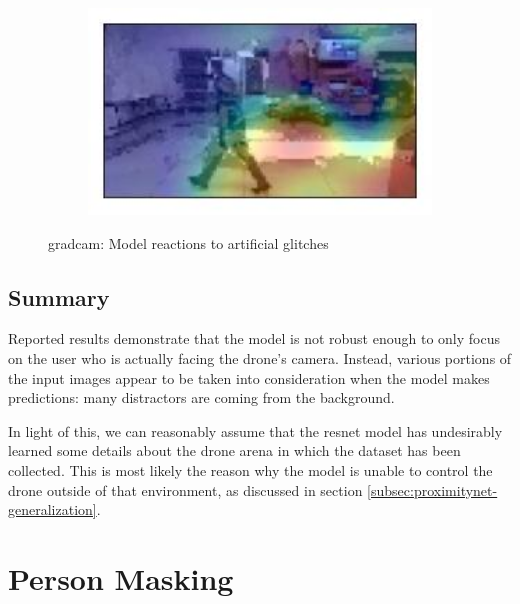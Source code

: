 \begin{figure}[!h]
\begin{center}
\begin{subfigure}[h]{0.24\textwidth}
		\end{subfigure}
		\hfill
		\begin{subfigure}[h]{0.24\textwidth}
			\centering
			\includegraphics[width=1\textwidth]{"contents/images/gradcam/gradcam-glitch-4"}
		\end{subfigure}
	\end{center}
	\vspace{-0.5cm}
	\caption[\gls{gradcam}: Model reactions to artificial glitches]{\gls{gradcam}: Model reactions to artificial glitches}
	\label{fig:gradcam-glitch}
\end{figure}



\subsection{Summary}
\label{subsec:proposed-approach}

Reported results demonstrate that the model is not robust enough to only focus on the user who is actually facing the drone's camera. Instead, various portions of the input images appear to be taken into consideration when the model makes predictions: many distractors are coming from the background.

In light of this, we can reasonably assume that the \gls{resnet} model has undesirably learned some details about the drone arena in which the dataset has been collected. This is most likely the reason why the model is unable to control the drone outside of that environment, as discussed in section \ref{subsec:proximitynet-generalization}.




\section{Person Masking}
\label{sec:masking}

